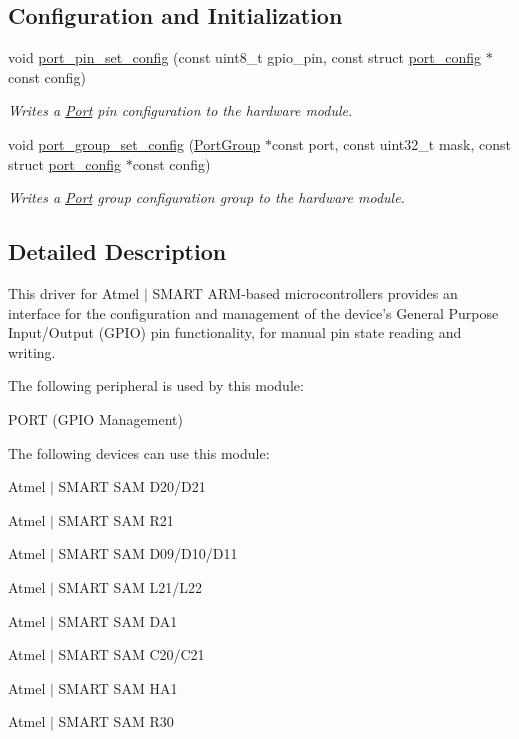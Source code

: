\subsection*{Configuration and Initialization}
\begin{DoxyCompactItemize}
\item 
void \hyperlink{group__asfdoc__sam0__port__group_gad21f235037f2d75ee3e7c08ba8b239c5}{port\+\_\+pin\+\_\+set\+\_\+config} (const uint8\+\_\+t gpio\+\_\+pin, const struct \hyperlink{structport__config}{port\+\_\+config} $\ast$const config)
\begin{DoxyCompactList}\small\item\em Writes a \hyperlink{struct_port}{Port} pin configuration to the hardware module. \end{DoxyCompactList}\item 
void \hyperlink{group__asfdoc__sam0__port__group_ga7b832928bee6911ac7c9f18df8a5cf4a}{port\+\_\+group\+\_\+set\+\_\+config} (\hyperlink{struct_port_group}{Port\+Group} $\ast$const port, const uint32\+\_\+t mask, const struct \hyperlink{structport__config}{port\+\_\+config} $\ast$const config)
\begin{DoxyCompactList}\small\item\em Writes a \hyperlink{struct_port}{Port} group configuration group to the hardware module. \end{DoxyCompactList}\end{DoxyCompactItemize}


\subsection{Detailed Description}
This driver for Atmel\textregistered{} $\vert$ S\+M\+A\+R\+T A\+R\+M\textregistered{}-\/based microcontrollers provides an interface for the configuration and management of the device's General Purpose Input/\+Output (G\+P\+I\+O) pin functionality, for manual pin state reading and writing.

The following peripheral is used by this module\+:
\begin{DoxyItemize}
\item P\+O\+R\+T (G\+P\+I\+O Management)
\end{DoxyItemize}

The following devices can use this module\+:
\begin{DoxyItemize}
\item Atmel $\vert$ S\+M\+A\+R\+T S\+A\+M D20/\+D21
\item Atmel $\vert$ S\+M\+A\+R\+T S\+A\+M R21
\item Atmel $\vert$ S\+M\+A\+R\+T S\+A\+M D09/\+D10/\+D11
\item Atmel $\vert$ S\+M\+A\+R\+T S\+A\+M L21/\+L22
\item Atmel $\vert$ S\+M\+A\+R\+T S\+A\+M D\+A1
\item Atmel $\vert$ S\+M\+A\+R\+T S\+A\+M C20/\+C21
\item Atmel $\vert$ S\+M\+A\+R\+T S\+A\+M H\+A1
\item Atmel $\vert$ S\+M\+A\+R\+T S\+A\+M R30
\end{DoxyItemize}

